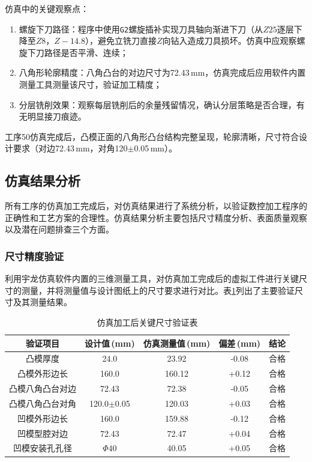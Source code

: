 \documentclass{xautCADreport}
\begin{document}
仿真中的关键观察点：

\begin{enumerate}
  \item 螺旋下刀路径：程序中使用\verb|G2|螺旋插补实现刀具轴向渐进下刀（从$Z25$逐层下降至$Z8$，$Z-14.8$），避免立铣刀直接$Z$向钻入造成刀具损坏。仿真中应观察螺旋下刀路径是否平滑、连续；
  \item 八角形轮廓精度：八角凸台的对边尺寸为72.43\,mm，仿真完成后应用软件内置测量工具测量该尺寸，验证加工精度；
  \item 分层铣削效果：观察每层铣削后的余量残留情况，确认分层策略是否合理，有无明显接刀痕迹。
\end{enumerate}

工序50仿真完成后，凸模正面的八角形凸台结构完整呈现，轮廓清晰，尺寸符合设计要求（对边72.43\,mm，对角120$\pm$0.05\,mm）。

\subsection{仿真结果分析}

所有工序的仿真加工完成后，对仿真结果进行了系统分析，以验证数控加工程序的正确性和工艺方案的合理性。仿真结果分析主要包括尺寸精度分析、表面质量观察以及潜在问题排查三个方面。

\subsubsection{尺寸精度验证}

利用宇龙仿真软件内置的三维测量工具，对仿真加工完成后的虚拟工件进行关键尺寸的测量，并将测量值与设计图纸上的尺寸要求进行对比。表\ref{tab:sim-dim-verify}列出了主要验证尺寸及其测量结果。

\begin{table}[H]
  \centering
  \caption{仿真加工后关键尺寸验证表}
  \label{tab:sim-dim-verify}
  \begin{tabular}{ccccc}
    \toprule
    验证项目 & 设计值\,(mm) & 仿真测量值\,(mm) & 偏差\,(mm) & 结论 \\
    \midrule
    凸模厚度             & 24.0   & 23.92    & -0.08   & 合格 \\
    凸模外形边长         & 160.0  & 160.12    & +0.12   & 合格 \\
    凸模八角凸台对边   & 72.43  & 72.38    & -0.05   & 合格 \\
    凸模八角凸台对角   & 120.0$\pm$0.05 & 120.03 & +0.03 & 合格 \\
    凹模外形边长         & 160.0  & 159.88    & -0.12   & 合格 \\
    凹模型腔对边       & 72.43  & 72.47    & +0.04   & 合格 \\
    凹模安装孔孔径     & $\Phi40$ & 40.05   & +0.05   & 合格 \\
    \bottomrule
  \end{tabular}
\end{table}
\end{document}
